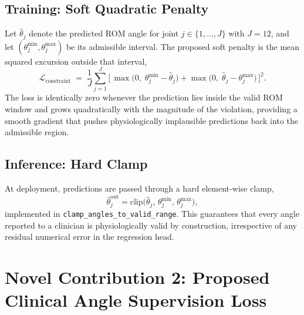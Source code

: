 \subsection{Training: Soft Quadratic Penalty}
Let $\hat{\theta}_{j}$ denote the predicted ROM angle for joint
$j\!\in\!\{1,\dots,J\}$ with $J\!=\!12$, and let $(\theta^{\min}_{j},
\theta^{\max}_{j})$ be its admissible interval. The proposed soft
penalty is the mean squared excursion outside that interval,
\begin{equation}
\mathcal{L}_{\mathrm{constraint}} \;=\;
\frac{1}{J}\sum_{j=1}^{J}
\Big[\,\max\!\big(0,\;\theta^{\min}_{j}-\hat{\theta}_{j}\big)
+ \max\!\big(0,\;\hat{\theta}_{j}-\theta^{\max}_{j}\big)\,\Big]^{2}.
\label{eq:constraint}
\end{equation}
The loss is identically zero whenever the prediction lies inside the
valid ROM window and grows quadratically with the magnitude of the
violation, providing a smooth gradient that pushes physiologically
implausible predictions back into the admissible region.

\subsection{Inference: Hard Clamp}
At deployment, predictions are passed through a hard element-wise
clamp,
\begin{equation}
\hat{\theta}^{\mathrm{out}}_{j} = \mathrm{clip}\!\big(\hat{\theta}_{j},\,
\theta^{\min}_{j},\,\theta^{\max}_{j}\big),
\label{eq:clamp}
\end{equation}
implemented in \texttt{clamp\_angles\_to\_valid\_range}. This
guarantees that every angle reported to a clinician is physiologically
valid by construction, irrespective of any residual numerical error in
the regression head.

\section{Novel Contribution 2: Proposed Clinical Angle Supervision Loss}
\label{sec:n2-clinical-loss}

